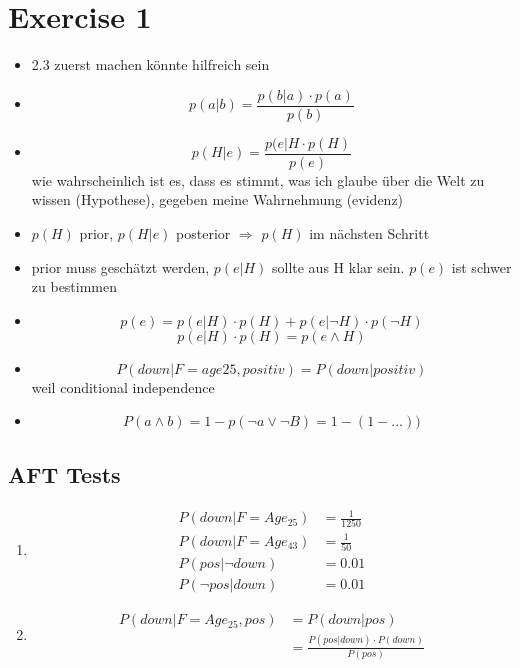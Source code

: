 \documentclass[fleqn,12pt]{scrartcl}
\newcommand{\blattn}{Exercise 1}
\begin{document}
\section*{\blattn}
\setcounter{section}{1}
\begin{itemize}
	\item
2.3 zuerst machen könnte hilfreich sein
\item
$$
p(a|b) = \frac{p(b|a)\cdot p(a)}{p(b)}
$$

\item
$$p(H|e) = \frac{p(e|H \cdot p(H)}{p(e)}
$$
wie wahrscheinlich ist es, dass es stimmt, was ich glaube über die Welt zu wissen (Hypothese), gegeben meine Wahrnehmung (evidenz)

\item
$p(H)$ prior, $p(H|e)$ posterior $\Rightarrow$ $p(H)$ im nächsten Schritt

\item
prior muss geschätzt werden, $p(e|H)$ sollte aus H klar sein. $p(e)$ ist schwer zu bestimmen
\item
	$$p(e) = p(e|H) \cdot p(H) + p(e|\neg H) \cdot p(\neg H)$$
	$$p(e|H) \cdot p(H) = p(e\wedge H)$$
\item
	$$P(down | F=age25, positiv) = P(down | positiv)$$ weil conditional independence
\item
	$$P(a\wedge b) = 1 - p(\neg a \vee \neg B) = 1 - (1 -  \dots ) )$$
\end{itemize}

\subsection{AFT Tests}
\begin{enumerate}
	\item
\begin{align*}
	P(down | F=Age_{25}) &= \frac1{1250}\\
	P(down | F=Age_{43}) &= \frac1{50}\\
	P(pos | \neg down) &= 0.01\\
	P(\neg pos | down) &= 0.01
\end{align*}
\item
	\begin{align*}
		P(down | F=Age_{25}, pos) &= P(down | pos) \\
																											 &= \frac{P(pos|down)\cdot P(down)}{P(pos)}
	\end{align*}

\end{enumerate}
\end{document}
